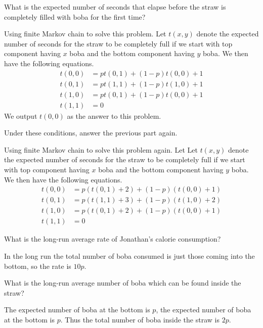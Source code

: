 \documentclass[11pt]{article}
\begin{document}
\begin{Parts}
    
    \Part What is the expected number of seconds that elapse before the straw is completely filled with boba for the first time?
    \begin{Answer}
        Using finite Markov chain to solve this problem. Let $t(x,y)$ denote the expected number of seconds for the straw to 
        be completely full if we start with top component having $x$ boba and the bottom component having $y$ boba. We then have the following equations. 
        \begin{align*}
            t(0,0) &= pt(0,1) + (1-p)t(0,0) + 1 \\
            t(0,1) &= pt(1,1) + (1-p)t(1,0) + 1 \\
            t(1,0) &= pt(0,1) + (1-p)t(0,0) + 1 \\
            t(1,1) &= 0
        \end{align*}
        We output $t(0,0)$ as the answer to this problem.
    \end{Answer}

    \Part Under these conditions, answer the previous part again. 
    \begin{Answer}
        Using finite Markov chain to solve this problem again. Let Let $t(x,y)$ denote the expected number of seconds for the straw to 
        be completely full if we start with top component having $x$ boba and the bottom component having $y$ boba. We then have the following equations. 
        \begin{align*}
            t(0,0) &= p(t(0,1) + 2) + (1-p)(t(0,0) + 1) \\
            t(0,1) &= p(t(1,1) + 3) + (1-p)(t(1,0) + 2) \\
            t(1,0) &= p(t(0,1) + 2) + (1-p)(t(0,0) + 1) \\
            t(1,1) &= 0
        \end{align*}
    \end{Answer}

    \Part What is the long-run average rate of Jonathan’s calorie consumption?
    \begin{Answer}
        In the long run the total number of boba consumed is just those coming into the bottom, so the rate is $10p$. 
    \end{Answer}

    \Part What is the long-run average number of boba which can be found inside the straw?
    \begin{Answer}
        The expected number of boba at the bottom is $p$, the expected number of boba at the bottom is $p$. Thus the 
        total number of boba inside the straw is $2p$. 
    \end{Answer}

\end{Parts}
    
\end{document}
